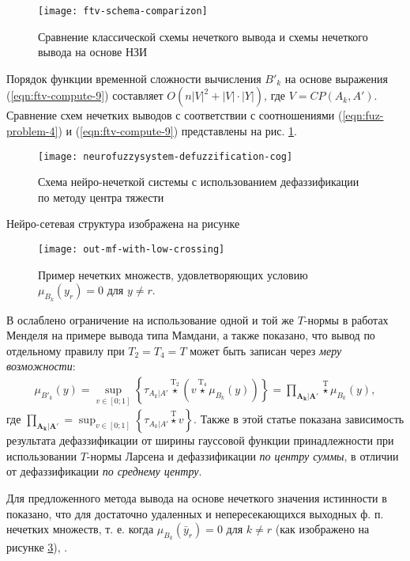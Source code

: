 \begin{figure}[tbh!]
\centering
\texttt{[image: ftv-schema-comparizon]}
\caption{Сравнение классической схемы нечеткого вывода и схемы нечеткого вывода на основе НЗИ}
\label{fig:ftv-schema-comparizon}
\end{figure}

Порядок функции временной сложности вычисления $B'_k$ на основе выражения (\ref{eqn:ftv-compute-9}) составляет $O\left(n|V|^2+|V|\cdot |Y|\right)$, где $V=CP(A_k, A')$. Сравнение схем нечетких выводов с соответствии с соотношениями (\ref{eqn:fuz-problem-4}) и (\ref{eqn:ftv-compute-9}) представлены на рис. \cref{fig:ftv-schema-comparizon}.

\begin{figure}[th]
	\centering
	\texttt{[image: neurofuzzysystem-defuzzification-cog]}
	\caption{Схема нейро-нечеткой системы с использованием дефаззификации по методу центра тяжести}
	\label{fig:neurofuzzysystem-defuzzification-cog}
\end{figure}

Нейро-сетевая структура изображена на рисунке 

\begin{figure}[ht]
	\centering
	\texttt{[image: out-mf-with-low-crossing]}
	\caption{Пример нечетких множеств, удовлетворяющих условию $\mu_{B_k}(y_r) = 0$ для $y \ne r$.}
	\label{fig:out-mf-with-low-crossing}
\end{figure}

В \cite{} ослаблено ограничение на использование одной и той же $T$-нормы в работах Менделя на примере вывода типа Мамдани, а также показано, что вывод по отдельному правилу при $T_2 = T_4 = T$ может быть записан через \textit{меру возможности}:
\begin{align*}
	\mu_{B'_k}(y) = \sup_{v\in[0;1]}\left\{\tau_{A_{k}|A'} \overset{\mathrm{T_2}}{\star} (v \overset{\mathrm{T_4}}{\star} \mu_{B_k}(y)) \right\} = \textstyle\prod_{\mathbf{A_k}|\mathbf{A'}} \overset{\mathrm{T}}{\star} \mu_{B_k}(y),
\end{align*}
где $\prod_{\mathbf{A_k}|\mathbf{A'}}=\sup_{v\in[0;1]}\left\{\tau_{A_{k}|A'} \overset{\mathrm{T}}{\star} v\right\}$.
Также в этой статье показана зависимость результата дефаззификации от ширины гауссовой функции принадлежности при использовании $T$-нормы Ларсена и дефаззификации \textit{по центру суммы}, в отличии от дефаззификации \textit{по среднему центру}.

Для предложенного метода вывода на основе нечеткого значения истинности в \cite{} показано, что для достаточно удаленных и непересекающихся выходных ф. п. нечетких множеств, т. е. когда $\mu_{B_k}(\bar{y}_r) = 0$ для $k \ne r$ (как изображено на рисунке \cref{fig:out-mf-with-low-crossing}), .

